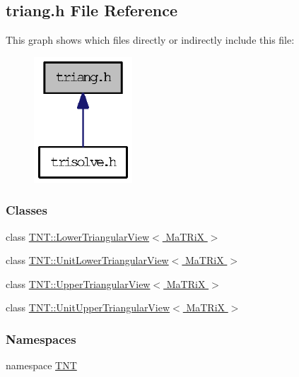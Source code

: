 \subsection{triang.h File Reference}
\label{triang_8h}
This graph shows which files directly or indirectly include this file:
\nopagebreak
\begin{figure}[H]
\begin{center}
\leavevmode
\includegraphics[width=104pt]{triang_8h__dep__incl}
\end{center}
\end{figure}
\subsubsection*{Classes}
\begin{DoxyCompactItemize}
\item 
class \hyperlink{class_t_n_t_1_1_lower_triangular_view}{TNT::LowerTriangularView$<$ MaTRiX $>$}
\item 
class \hyperlink{class_t_n_t_1_1_unit_lower_triangular_view}{TNT::UnitLowerTriangularView$<$ MaTRiX $>$}
\item 
class \hyperlink{class_t_n_t_1_1_upper_triangular_view}{TNT::UpperTriangularView$<$ MaTRiX $>$}
\item 
class \hyperlink{class_t_n_t_1_1_unit_upper_triangular_view}{TNT::UnitUpperTriangularView$<$ MaTRiX $>$}
\end{DoxyCompactItemize}
\subsubsection*{Namespaces}
\begin{DoxyCompactItemize}
\item 
namespace \hyperlink{namespace_t_n_t}{TNT}
\end{DoxyCompactItemize}
